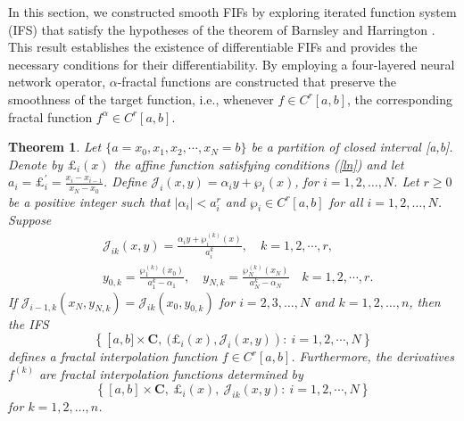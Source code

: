\documentclass{article}[12pt, a4]
\newtheorem{theorem}{\large Theorem}[section]
\begin{document}
	In this section, we constructed smooth FIFs by exploring iterated function system (IFS) that satisfy the hypotheses of the theorem of Barnsley and Harrington \cite{BARNSLEY198914}. This result establishes the existence of differentiable FIFs and provides the necessary conditions for their differentiability. By employing a four-layered neural network operator, $\alpha$-fractal functions are constructed that preserve the smoothness of the target function, i.e., whenever $f \in C^r[a, b]$, the corresponding fractal function $f^\alpha \in C^r[a, b]$.\\
	
	
	\begin{theorem}\cite{BARNSLEY198914}  \label{brans}
		Let $\{a=x_0, x_1,x_2, \cdots, x_N=b\}$ be a partition of closed interval [a,b]. Denote by \(\pounds_i(x)\) the affine function satisfying conditions (\ref{ln}) and let \(a_i = \pounds_i^{\prime} = \frac{x_i - x_{i-1}}{x_N - x_0}\). Define \(\mathcal{J}_{i}(x, y) = \alpha_i y + \wp_{i}(x)\), for \(i = 1, 2, \ldots, N\). Let \(r \geqslant 0\) be a positive integer such that \(\left|\alpha_i\right| < a_i^r\) and \(\wp_{i} \in C^r\left[a, b\right]\) for all \(i = 1, 2, \ldots, N\). Suppose 
		\begin{align}  
			&\mathcal{J}_{i k}(x, y) = \frac{\alpha_i y + \wp_{i}^{(k)}(x)}{a_i^k}, \quad k=1,2,\cdots,r, \\  
			&y_{0, k} = \frac{\wp_1^{(k)}\left(x_0\right)}{a_1^k - \alpha_1}, \quad y_{N, k} = \frac{\wp_N^{(k)}\left(x_N\right)}{a_N^k - \alpha_N} \quad  k=1,2,\cdots,r .  
		\end{align}  
		If \(\mathcal{J}_{i-1, k}\left(x_N, y_{N, k}\right) = \mathcal{J}_{i k}\left(x_0, y_{0, k}\right)\) for \(i = 2, 3, \ldots, N\) and \(k = 1, 2, \ldots, n\), then the IFS 
		\begin{equation*}
			\left\{\left[a,b]\times \mathbf{C},~ (\pounds_i(x), \mathcal{J}_{i}(x, y)\right):~i=1,2,\cdots,N\right\}
		\end{equation*} 
		defines a fractal interpolation function \(f \in C^r\left[a,b\right]\). Furthermore, the derivatives \(f^{(k)}\) are fractal interpolation functions determined by 
		\begin{equation*}
			\left\{[a,b]\times \mathbf{C},~
			\pounds_i(x),~ \mathcal{J}_{ik}(x,y): ~ i =1,2,\cdots,N\right\}
		\end{equation*} for \(k = 1, 2, \ldots, n\).  
	\end{theorem}
	
\end{document}
